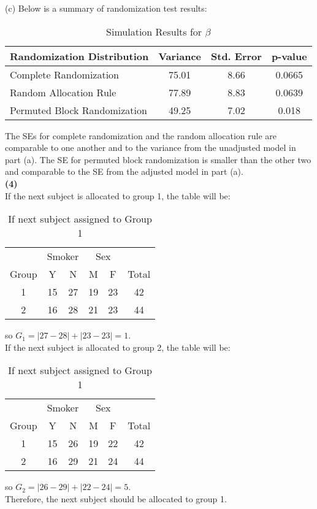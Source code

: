 \documentclass[11pt,a4paper]{article}
\begin{document}
\noindent
(c) Below is a summary of randomization test results:
\begin{table}[H]
\centering
\begin{tabular}{lccc}
\hline
Randomization Distribution & Variance & Std. Error &  p-value \\ 
\hline
Complete Randomization & 75.01 & 8.66 & 0.0665\\
Random Allocation Rule & 77.89 & 8.83 & 0.0639 \\
Permuted Block Randomization &49.25  & 7.02 & 0.018\\
\hline
\end{tabular}
\caption{Simulation Results for $\hat{\beta}$}
\end{table}
The SEs for complete randomization and the random allocation rule are comparable to one another and to the variance from the unadjusted model in part (a). The SE for permuted block randomization is smaller than the other two and comparable to the SE from the adjusted model in part (a). \\

\noindent
\textbf{(4)} \\
If the next subject is allocated to group 1, the table will be:
\begin{table}[H]
\centering
\begin{tabular}{cccccc}
\hline
& \multicolumn{2}{c}{Smoker} & \multicolumn{2}{c}{Sex} & \\
Group & Y & N & M & F & Total \\
\hline
1 & 15 & 27 & 19 & 23 & 42 \\
2 & 16 & 28 & 21 & 23 & 44 \\
\hline
\end{tabular}
\caption{If next subject assigned to Group 1}
\end{table}
so $G_1 = |27 - 28| + |23 - 23| = 1.$ \\
If the next subject is allocated to group 2, the table will be:
\begin{table}[H]
\centering
\begin{tabular}{cccccc}
\hline
& \multicolumn{2}{c}{Smoker} & \multicolumn{2}{c}{Sex} & \\
Group & Y & N & M & F & Total \\
\hline
1 & 15 & 26 & 19 & 22 & 42 \\
2 & 16 & 29 & 21 & 24 & 44 \\
\hline
\end{tabular}
\caption{If next subject assigned to Group 1}
\end{table}
so $G_2 = |26 - 29| + |22 - 24| = 5.$ \\
Therefore, the next subject should be allocated to group 1.
\end{document}
